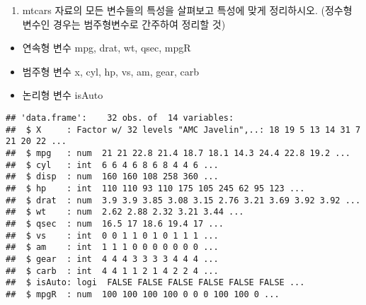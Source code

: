 \documentclass[]{article}
\newenvironment{Shaded}{\begin{snugshade}}{\end{snugshade}}
\newcommand{\KeywordTok}[1]{\textcolor[rgb]{0.13,0.29,0.53}{\textbf{#1}}}
\newcommand{\DecValTok}[1]{\textcolor[rgb]{0.00,0.00,0.81}{#1}}
\newcommand{\StringTok}[1]{\textcolor[rgb]{0.31,0.60,0.02}{#1}}
\newcommand{\CommentTok}[1]{\textcolor[rgb]{0.56,0.35,0.01}{\textit{#1}}}
\newcommand{\OperatorTok}[1]{\textcolor[rgb]{0.81,0.36,0.00}{\textbf{#1}}}
\newcommand{\NormalTok}[1]{#1}
\providecommand{\tightlist}{%
  \setlength{\itemsep}{0pt}\setlength{\parskip}{0pt}}
\begin{document}
\begin{Shaded}
\end{Shaded}

\begin{enumerate}
\def\labelenumi{\arabic{enumi})}
\setcounter{enumi}{7}
\tightlist
\item
  mtcars 자료의 모든 변수들의 특성을 살펴보고 특성에 맞게 정리하시오.
  (정수형 변수인 경우는 범주형변수로 간주하여 정리할 것)
\end{enumerate}

\begin{itemize}
\tightlist
\item
  연속형 변수 mpg, drat, wt, qsec, mpgR
\item
  범주형 변수 x, cyl, hp, vs, am, gear, carb
\item
  논리형 변수 isAuto
\end{itemize}

\begin{Shaded}
\end{Shaded}

\begin{verbatim}
## 'data.frame':    32 obs. of  14 variables:
##  $ X     : Factor w/ 32 levels "AMC Javelin",..: 18 19 5 13 14 31 7 21 20 22 ...
##  $ mpg   : num  21 21 22.8 21.4 18.7 18.1 14.3 24.4 22.8 19.2 ...
##  $ cyl   : int  6 6 4 6 8 6 8 4 4 6 ...
##  $ disp  : num  160 160 108 258 360 ...
##  $ hp    : int  110 110 93 110 175 105 245 62 95 123 ...
##  $ drat  : num  3.9 3.9 3.85 3.08 3.15 2.76 3.21 3.69 3.92 3.92 ...
##  $ wt    : num  2.62 2.88 2.32 3.21 3.44 ...
##  $ qsec  : num  16.5 17 18.6 19.4 17 ...
##  $ vs    : int  0 0 1 1 0 1 0 1 1 1 ...
##  $ am    : int  1 1 1 0 0 0 0 0 0 0 ...
##  $ gear  : int  4 4 4 3 3 3 3 4 4 4 ...
##  $ carb  : int  4 4 1 1 2 1 4 2 2 4 ...
##  $ isAuto: logi  FALSE FALSE FALSE FALSE FALSE FALSE ...
##  $ mpgR  : num  100 100 100 100 0 0 0 100 100 0 ...
\end{verbatim}
\end{document}
